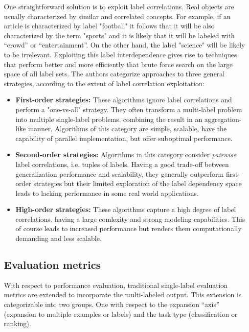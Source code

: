 \documentclass[12pt]{report}
\begin{document}
	One straightforward solution is to exploit label correlations. Real objects
  are usually characterized by similar and correlated concepts. For example, if an article is
  characterized by label "football" it follows that it will be also
  characterized by the term "sports" and it is likely that it will be labeled
  with ``crowd'' or ``entertainment''. On the other hand, the label "science"
  will be likely to be irrelevant. Exploiting this label interdependence gives
  rise to techniques that perform better and more efficiently that brute force
  search on the large space of all label sets. The authors categorize approaches
  to three general strategies, according to the extent of label correlation exploitation:
	
	\begin{itemize}
		\item \textbf{First-order strategies: }These algorithms ignore label
      correlations and perform a "one-vs-all" strategy. They often transform a
      multi-label problem into multiple single-label problems, combining the
      result in an aggregation-like manner. Algorithms of this category are
      simple, scalable, have the capability of parallel implementation, but
      offer suboptimal performance.
		\item \textbf{Second-order strategies: }Algorithms in this category consider
      \emph{pairwise} label correlations, i.e. tuples of labels. Having a good
      trade-off between generalization performance and scalability, they
      generally outperform first-order strategies but their limited exploration
      of the label dependency space leads to lacking performance in some real
      world applications.
		\item \textbf{High-order strategies: }These algorithms capture a high degree
      of label correlations, having a large comlexity and strong modeling
      capabilities. This of course leads to increased performance but renders them computationally demanding and less scalable.
	\end{itemize}
	
	\subsection*{Evaluation metrics}

	With respect to performance evaluation, traditional single-label evaluation metrics are extended to
  incorporate the multi-labeled output. This extension is categorizable into two
  groups. One with respect to the expansion ``axis'' (expansion to multiple examples or labels)
  and the task type (classification or ranking).
\end{document}
